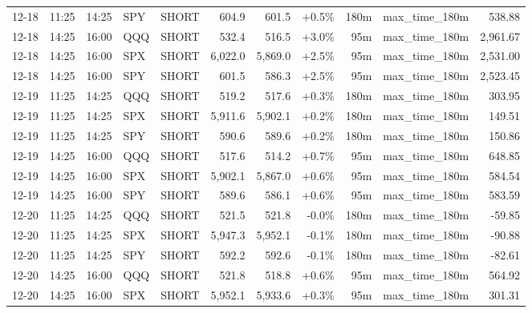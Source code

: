\documentclass[11pt,a4paper,twoside]{article}
\begin{document}
\begin{center}
\begin{longtable}{>{\color{txtmain}}l l l l l r r r r >{\color{txtmain}}l r}
12-18 & 11:25 & 14:25 & SPY & SHORT & 604.9 & 601.5 & \textcolor{wingreen}{+0.5\%} & 180m & max\_time\_180m & \textcolor{wingreen}{538.88} \\
12-18 & 14:25 & 16:00 & QQQ & SHORT & 532.4 & 516.5 & \textcolor{wingreen}{+3.0\%} & 95m & max\_time\_180m & \textcolor{wingreen}{2,961.67} \\
12-18 & 14:25 & 16:00 & SPX & SHORT & 6,022.0 & 5,869.0 & \textcolor{wingreen}{+2.5\%} & 95m & max\_time\_180m & \textcolor{wingreen}{2,531.00} \\
12-18 & 14:25 & 16:00 & SPY & SHORT & 601.5 & 586.3 & \textcolor{wingreen}{+2.5\%} & 95m & max\_time\_180m & \textcolor{wingreen}{2,523.45} \\
12-19 & 11:25 & 14:25 & QQQ & SHORT & 519.2 & 517.6 & \textcolor{wingreen}{+0.3\%} & 180m & max\_time\_180m & \textcolor{wingreen}{303.95} \\
12-19 & 11:25 & 14:25 & SPX & SHORT & 5,911.6 & 5,902.1 & \textcolor{wingreen}{+0.2\%} & 180m & max\_time\_180m & \textcolor{wingreen}{149.51} \\
12-19 & 11:25 & 14:25 & SPY & SHORT & 590.6 & 589.6 & \textcolor{wingreen}{+0.2\%} & 180m & max\_time\_180m & \textcolor{wingreen}{150.86} \\
12-19 & 14:25 & 16:00 & QQQ & SHORT & 517.6 & 514.2 & \textcolor{wingreen}{+0.7\%} & 95m & max\_time\_180m & \textcolor{wingreen}{648.85} \\
12-19 & 14:25 & 16:00 & SPX & SHORT & 5,902.1 & 5,867.0 & \textcolor{wingreen}{+0.6\%} & 95m & max\_time\_180m & \textcolor{wingreen}{584.54} \\
12-19 & 14:25 & 16:00 & SPY & SHORT & 589.6 & 586.1 & \textcolor{wingreen}{+0.6\%} & 95m & max\_time\_180m & \textcolor{wingreen}{583.59} \\
12-20 & 11:25 & 14:25 & QQQ & SHORT & 521.5 & 521.8 & \textcolor{lossred}{-0.0\%} & 180m & max\_time\_180m & \textcolor{lossred}{-59.85} \\
12-20 & 11:25 & 14:25 & SPX & SHORT & 5,947.3 & 5,952.1 & \textcolor{lossred}{-0.1\%} & 180m & max\_time\_180m & \textcolor{lossred}{-90.88} \\
12-20 & 11:25 & 14:25 & SPY & SHORT & 592.2 & 592.6 & \textcolor{lossred}{-0.1\%} & 180m & max\_time\_180m & \textcolor{lossred}{-82.61} \\
12-20 & 14:25 & 16:00 & QQQ & SHORT & 521.8 & 518.8 & \textcolor{wingreen}{+0.6\%} & 95m & max\_time\_180m & \textcolor{wingreen}{564.92} \\
12-20 & 14:25 & 16:00 & SPX & SHORT & 5,952.1 & 5,933.6 & \textcolor{wingreen}{+0.3\%} & 95m & max\_time\_180m & \textcolor{wingreen}{301.31} \\

\end{longtable}
\end{center}
\end{document}
